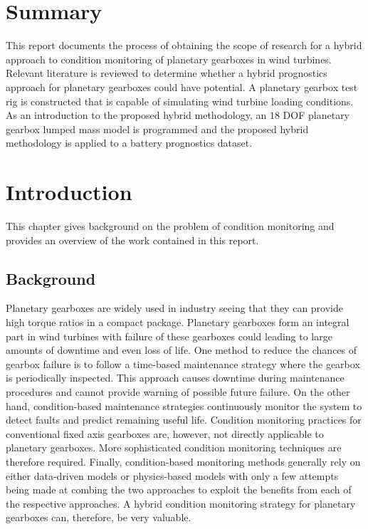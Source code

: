 \newpage

\chapter*{Summary}
This report documents the process of obtaining the scope of research for a hybrid approach to condition monitoring of planetary gearboxes in wind turbines. Relevant literature is reviewed to determine whether a hybrid prognostics approach for planetary gearboxes could have potential. A planetary gearbox test rig is constructed that is capable of simulating wind turbine loading conditions. As an introduction to the proposed hybrid methodology, an $18$ DOF planetary gearbox lumped mass model is programmed and the proposed hybrid methodology is applied to a battery prognostics dataset.



\chapter{Introduction}

This chapter gives background on the problem of condition monitoring and provides an overview of the work contained in this report.


\section{Background}

Planetary gearboxes are widely used in industry seeing that they can provide high torque ratios in a compact package. Planetary gearboxes form an integral part in wind turbines with failure of these gearboxes could leading to large amounts of downtime and even loss of life. One method to reduce the chances of gearbox failure is to follow a time-based maintenance strategy where the gearbox is periodically inspected. This approach causes downtime during maintenance procedures and cannot provide warning of possible future failure. On the other hand, condition-based maintenance strategies continuously monitor the system to detect faults and predict remaining useful life. Condition monitoring practices for conventional fixed axis gearboxes are, however, not directly applicable to planetary gearboxes. More sophisticated condition monitoring techniques are therefore required. Finally, condition-based monitoring methods generally rely on either data-driven models or physics-based models with only a few attempts being made at combing the two approaches to exploit the benefits from each of the respective approaches. A hybrid condition monitoring strategy for planetary gearboxes can, therefore, be very valuable.

